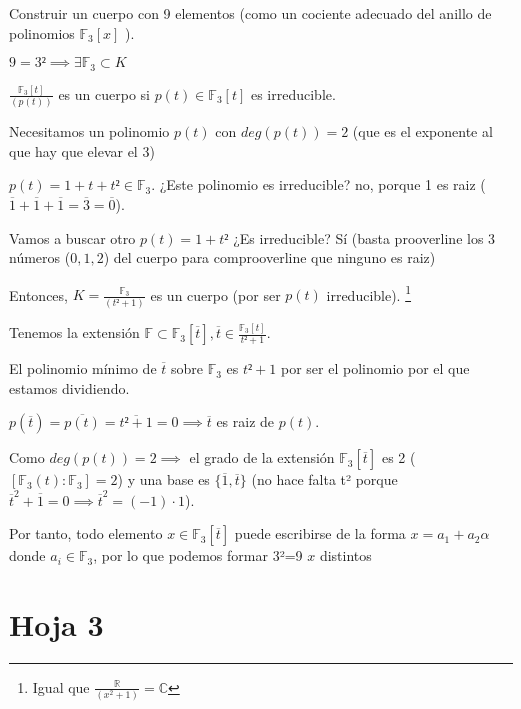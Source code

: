 \begin{problem}[6]
 \label{H1.E6}
 Construir un cuerpo con 9 elementos (como un cociente adecuado del anillo de polinomios $\mathbb{F}_3 [x]$ ).

\solution

$9=3² \implies ∃ \mathbb{F}_3 \subset K$

$\displaystyle \frac{\mathbb{F}_3[t]}{(p(t))}$ es un cuerpo si $p(t) \in \mathbb{F}_3[t]$ es irreducible.


Necesitamos un polinomio $p(t)$ con $deg(p(t)) = 2$ (que es el exponente al que hay que elevar el 3)

$p(t) = 1+t+t² ∈ \mathbb{F}_3$. ¿Este polinomio es irreducible? no, porque 1 es raiz ($\overline{1}+\overline{1}+\overline{1}=\overline{3} = \overline{0}$).

Vamos a buscar otro $p(t) = 1+t²$ ¿Es irreducible? Sí (basta prooverline los 3 números ($0,1,2$) del cuerpo para comprooverline que ninguno es raiz)

Entonces, $K = \frac{\mathbb{F}_3}{(t²+1)}$ es un cuerpo (por ser $p(t)$ irreducible). \footnote{Igual que $\displaystyle\frac{ℝ}{(x^2+1)} = ℂ$}

Tenemos la extensión $\mathbb{F} \subset \mathbb{F}_3[\overline{t}], \overline{t}∈ \frac{\mathbb{F}_3[t]}{t²+1}$.

El polinomio mínimo de $\overline{t}$ sobre $\mathbb{F}_3$ es $t²+1$ por ser el polinomio por el que estamos dividiendo.


$p(\overline{t}) = \overline{p(t)} = \overline{t²+1} = 0 \implies \overline{t}$ es raiz de $p(t)$.

Como $deg(p(t)) = 2 \implies $ el grado de la extensión $\mathbb{F}_3[\overline{t}]$ es 2 ($[\mathbb{F}_3(t):\mathbb{F}_3]=2$) y una base es $\{\overline{1},\overline{t}\}$ (no hace falta t² porque $\overline{t}^2 + \overline{1} = 0 \implies \overline{t}^2 = (-1)·1$).

Por tanto, todo elemento $x \in \mathbb{F}_3[\overline{t}]$ puede escribirse de la forma $x=a_1+a_2α$ donde $a_i \in \mathbb{F}_3$, por lo que podemos formar 3²=9 $x$ distintos
\end{problem}

\section{Hoja 3}

